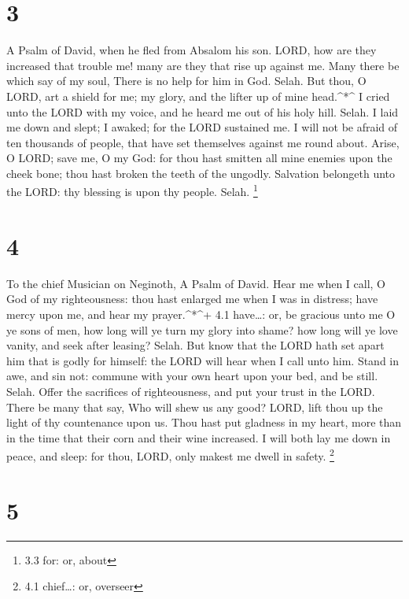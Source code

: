\hypertarget{section-2}{%
\section{3}\label{section-2}}

A Psalm of David, when he fled from Absalom his son.  LORD,
how are they increased that trouble me! many are they that rise up
against me.  Many there be which say of my soul, There is no
help for him in God. Selah.  But thou, O LORD, art a shield
for me; my glory, and the lifter up of mine head.\^{}*\^{} 
I cried unto the LORD with my voice, and he heard me out of his holy
hill. Selah.  I laid me down and slept; I awaked; for the
LORD sustained me.  I will not be afraid of ten thousands of
people, that have set themselves against me round about. 
Arise, O LORD; save me, O my God: for thou hast smitten all mine enemies
upon the cheek bone; thou hast broken the teeth of the ungodly.
 Salvation belongeth unto the LORD: thy blessing is upon thy
people. Selah. \footnote{3.3 for: or, about}

\hypertarget{section-3}{%
\section{4}\label{section-3}}

To the chief Musician on Neginoth, A Psalm of David.  Hear
me when I call, O God of my righteousness: thou hast enlarged me when I
was in distress; have mercy upon me, and hear my prayer.\^{}*\^{}+ 4.1
have\ldots: or, be gracious unto me  O ye sons of men, how
long will ye turn my glory into shame? how long will ye love vanity, and
seek after leasing? Selah.  But know that the LORD hath set
apart him that is godly for himself: the LORD will hear when I call unto
him.  Stand in awe, and sin not: commune with your own heart
upon your bed, and be still. Selah.  Offer the sacrifices of
righteousness, and put your trust in the LORD.  There be
many that say, Who will shew us any good? LORD, lift thou up the light
of thy countenance upon us.  Thou hast put gladness in my
heart, more than in the time that their corn and their wine increased.
 I will both lay me down in peace, and sleep: for thou,
LORD, only makest me dwell in safety. \footnote{4.1 chief\ldots: or,
  overseer}

\hypertarget{section-4}{%
\section{5}\label{section-4}}

